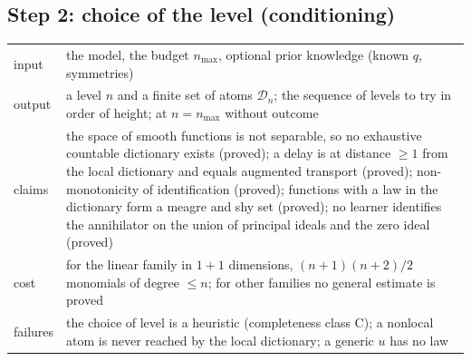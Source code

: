 \subsection*{Step 2: choice of the level (conditioning)}
\begin{tabular}{@{}p{2.2cm}p{9.6cm}@{}}
\toprule
input & the model, the budget $n_{\max}$, optional prior knowledge (known $q$, symmetries)\\
output & a level $n$ and a finite set of atoms $\mathcal D_n$; the sequence of levels to try in order of height; \UND{} at $n=n_{\max}$ without outcome\\
claims & the space of smooth functions is not separable, so no exhaustive countable dictionary exists (proved); a delay is at distance $\ge1$ from the local dictionary and equals augmented transport (proved); non-monotonicity of identification (proved); functions with a law in the dictionary form a meagre and shy set (proved); no learner identifies the annihilator on the union of principal ideals and the zero ideal (proved)\\
cost & for the linear family in $1{+}1$ dimensions, $(n+1)(n+2)/2$ monomials of degree $\le n$; for other families no general estimate is proved\\
failures & the choice of level is a heuristic (completeness class C); a nonlocal atom is never reached by the local dictionary; a generic $u$ has no law\\
\bottomrule
\end{tabular}

